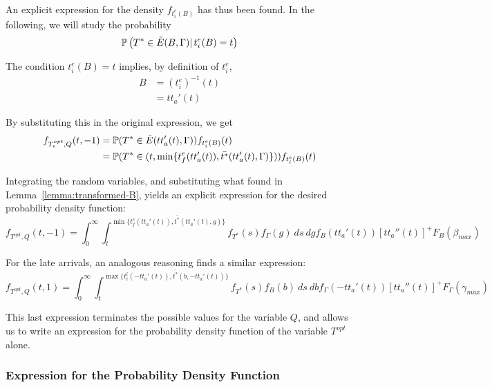 An explicit expression for the density \(f_{t_i^e(B)}\) has thus been found.
In the following, we will study the probability
\begin{equation*}
  \mathbb{P}\left(T^* \in \tilde{E}(B, \Gamma)|\, t_i^e(B) = t\right)
\end{equation*}

The condition \(t_i^e(B) = t\) implies, by definition of \(t_i^e\),
\begin{align*}
  B & = (t_i^e)^{-1}(t) \\
    & = tt_a'(t)
\end{align*}

By substituting this in the original expression, we get
\begin{equation}
  \label{eq:early-subst}
  \begin{split}
    f_{T_e^{opt}, Q}(t, -1) & = \mathbb{P}(T^* \in \tilde{E}(tt_a'(t), \Gamma))f_{t_i^e(B)}(t)\\
    & = \mathbb{P}(T^* \in (t, \min\{t_f^e(tt_a'(t)), \bar{t^*}(tt_a'(t), \Gamma)\}))f_{t_i^e(B)}(t)
  \end{split}
\end{equation}

Integrating the random variables,
and substituting what found in Lemma~\ref{lemma:transformed-B},
yields an explicit expression for the desired probability density function:
\begin{equation}
  \label{eq:early-final}
  f_{T^{opt}, Q}(t, -1) = \int_0^\infty \int_t^{\min\{t_f^e(tt_a'(t)), \bar{t^*}(tt_a'(t), g)\}}f_{T^*}(s) f_\Gamma(g)\ ds\ dg f_B(tt_a'(t)) [tt_a''(t)]^+ F_B(\beta_{max})
\end{equation}

For the late arrivals, an analogous reasoning finds a similar expression:
\begin{equation}
  \label{eq:late-final}
  f_{T^{opt}, Q}(t, 1) = \int_0^\infty \int_t^{\max\{t_i^l(-tt_a'(t)), \bar{t^*}(b, -tt_a'(t))\}}f_{T^*}(s) f_B(b)\ ds\ db f_\Gamma(-tt_a'(t)) [tt_a''(t)]^+ F_\Gamma(\gamma_{max})
\end{equation}

This last expression terminates the possible values for the variable \(Q\),
and allows us to write an expression for the probability density function of the variable \(T^{opt}\) alone.

\subsubsection{Expression for the Probability Density Function}

